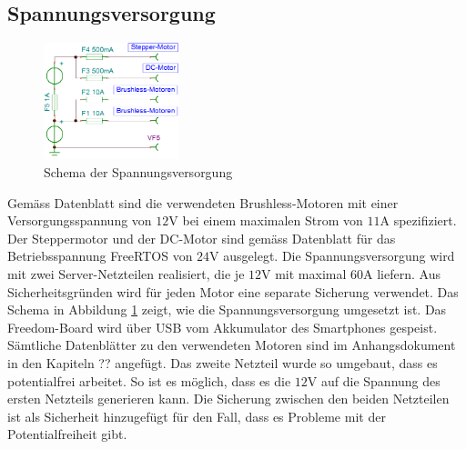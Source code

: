     \subsection{Spannungsversorgung}       
        \begin{figure}
           	\includegraphics[width=0.35\textwidth,clip,trim=0mm 0.5mm 0mm 0mm]
           	{Enddokumentation/Bilder/BeschaltungNetzteile.png}
           	\centering
           	\caption{Schema der Spannungsversorgung} 
           	\label{abb:Spannungsversorgung}
        \end{figure}
        Gemäss Datenblatt sind die verwendeten Brushless-Motoren mit einer Versorgungsspannung 
        von $12\si{\volt}$ bei einem maximalen Strom von $11\si{\ampere}$ spezifiziert. 
        Der Steppermotor und der DC-Motor sind gemäss Datenblatt für das Betriebsspannung FreeRTOS 
        von $24\si{\volt}$ ausgelegt. Die Spannungsversorgung wird mit zwei Server-Netzteilen 
        realisiert, die je $12\si{\volt}$ mit maximal $60\si{\ampere}$ liefern. Aus 
        Sicherheitsgründen wird für jeden Motor eine separate Sicherung verwendet. Das Schema 
        in Abbildung \ref{abb:Spannungsversorgung} zeigt, wie die Spannungsversorgung 
        umgesetzt ist. Das Freedom-Board wird über USB vom Akkumulator des Smartphones 
        gespeist. Sämtliche Datenblätter zu den verwendeten Motoren sind im Anhangsdokument in den Kapiteln ?? 
        angefügt. Das zweite Netzteil wurde so umgebaut, dass es potentialfrei arbeitet. So 
        ist es möglich, dass es die $12\si{\volt}$ auf die Spannung des ersten Netzteils 
        generieren kann. Die Sicherung zwischen den beiden Netzteilen ist als Sicherheit 
        hinzugefügt für den Fall, dass es Probleme mit der Potentialfreiheit gibt.	
